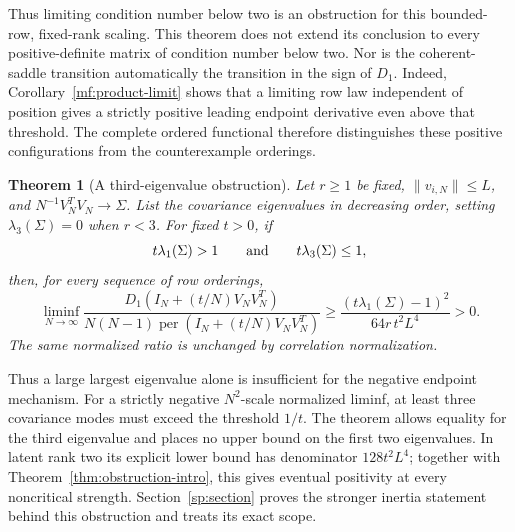 \documentclass[11pt]{article}
\newtheorem{theorem}{Theorem}[section]
\theoremstyle{remark}\newtheorem{remark}[theorem]{Remark}
\newcommand{\per}{\operatorname{per}}
\begin{document}
Thus limiting condition number below two is an obstruction for this
bounded-row, fixed-rank scaling. This theorem does not extend its
conclusion to every positive-definite matrix of condition number below
two. Nor is the coherent-saddle transition automatically the transition
in the sign of $D_1$.
Indeed, Corollary~\ref{mf:product-limit} shows that a limiting row law
independent of position gives a strictly positive leading endpoint
derivative even above that threshold. The complete ordered functional
therefore distinguishes these positive configurations from the
counterexample orderings.

\begin{theorem}[A third-eigenvalue obstruction]\label{thm:third-intro}
Let $r\ge1$ be fixed, $\|v_{i,N}\|\le L$, and
$N^{-1}V_N^TV_N\to\Sigma$. List the covariance eigenvalues in
decreasing order, setting $\lambda_3(\Sigma)=0$ when $r<3$.
For fixed $t>0$, if
\[
 t\lambda_1(\Sigma)>1\qquad\hbox{and}\qquad
 t\lambda_3(\Sigma)\le1,
\]
then, for every sequence of row orderings,
\[
 \liminf_{N\to\infty}
 \frac{D_1(I_N+(t/N)V_NV_N^T)}
 {N(N-1)\per(I_N+(t/N)V_NV_N^T)}
 \ge\frac{(t\lambda_1(\Sigma)-1)^2}{64r\,t^2L^4}>0.
\]
The same normalized ratio is unchanged by correlation normalization.
\end{theorem}

Thus a large largest eigenvalue alone is insufficient for the negative
endpoint mechanism. For a strictly negative $N^2$-scale normalized
liminf, at least three covariance modes must exceed the
threshold $1/t$. The theorem allows equality for the third eigenvalue
and places no upper bound on the first two eigenvalues. In latent rank
two its explicit lower bound has denominator $128t^2L^4$; together with
Theorem~\ref{thm:obstruction-intro}, this gives eventual positivity at
every noncritical strength. Section~\ref{sp:section} proves the stronger
inertia statement behind this obstruction and treats its exact scope.
\end{document}

